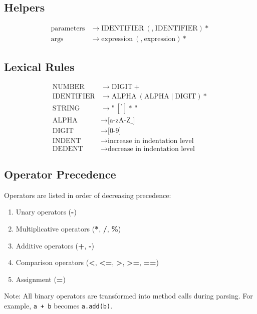 \documentclass[12pt, a4paper]{article}
\begin{document}
\subsection{Helpers}
\[
\begin{aligned}
\text{parameters} &\rightarrow \text{IDENTIFIER}\ (\textbf{,}\ \text{IDENTIFIER})* \\
\text{args} &\rightarrow \text{expression}\ (\textbf{,}\ \text{expression})*
\end{aligned}
\]

\subsection{Lexical Rules}
\[
\begin{aligned}
\text{NUMBER} &\rightarrow \text{DIGIT}+ \\
\text{IDENTIFIER} &\rightarrow \text{ALPHA}\ (\text{ALPHA} \mid \text{DIGIT})* \\
\text{STRING} &\rightarrow \textbf{"}\ [^\textbf{"}]*\ \textbf{"} \\
\text{ALPHA} &\rightarrow \text{[a-zA-Z\_]} \\
\text{DIGIT} &\rightarrow \text{[0-9]} \\
\text{INDENT} &\rightarrow \text{increase in indentation level} \\
\text{DEDENT} &\rightarrow \text{decrease in indentation level}
\end{aligned}
\]

\subsection{Operator Precedence}
Operators are listed in order of decreasing precedence:

\begin{enumerate}
\item Unary operators (\textbf{-})
\item Multiplicative operators (\textbf{*}, \textbf{/}, \textbf{\%})
\item Additive operators (\textbf{+}, \textbf{-})
\item Comparison operators (\textbf{<}, \textbf{<=}, \textbf{>}, \textbf{>=}, \textbf{==})
\item Assignment (\textbf{=})
\end{enumerate}

Note: All binary operators are transformed into method calls during parsing. For example, \texttt{a + b} becomes \texttt{a.add(b)}.
\end{document}
